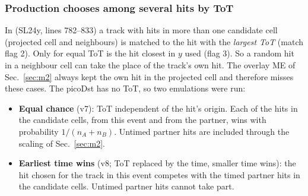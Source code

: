 \subsubsection{Production chooses among several hits by ToT}
In  (SL24y, lines 782--833) a track with hits in more than one candidate cell (projected cell
and neighbours) is matched to the hit with the \emph{largest ToT} (match flag 2). Only for equal ToT is the hit
closest in $y$ used (flag 3). So a random hit in a neighbour cell can take the place of the track's own hit. The overlay
ME of Sec.~\ref{sec:m2} always kept the own hit in the projected cell and therefore misses these cases. The picoDst
has no ToT, so two emulations were run:
\begin{itemize}
\item \textbf{Equal chance} (v7): ToT independent of the hit's origin. Each of the hits in the candidate cells,
  from this event and from the partner, wins with probability $1/(n_A+n_B)$. Untimed partner hits are included
  through the scaling of Sec.~\ref{sec:m2}.
\item \textbf{Earliest time wins} (v8; ToT replaced by the time, smaller time wins): the hit chosen for the track in
  this event competes with the timed partner hits in the candidate cells. Untimed partner hits cannot take part.
\end{itemize}

